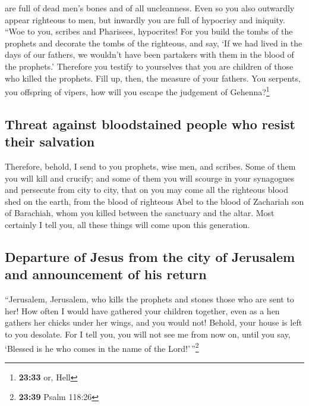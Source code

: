 are full of dead men's bones and of all uncleanness. 
Even so you also outwardly appear righteous to men, but inwardly you are
full of hypocrisy and iniquity.  ``Woe to you, scribes
and Pharisees, hypocrites! For you build the tombs of the prophets and
decorate the tombs of the righteous,  and say, `If we had
lived in the days of our fathers, we wouldn't have been partakers with
them in the blood of the prophets.'  Therefore you
testify to yourselves that you are children of those who killed the
prophets.  Fill up, then, the measure of your fathers.
 You serpents, you offspring of vipers, how will you
escape the judgement of Gehenna?\footnote{\textbf{23:33} or, Hell}

\hypertarget{threat-against-bloodstained-people-who-resist-their-salvation}{%
\subsection{Threat against bloodstained people who resist their
salvation}\label{threat-against-bloodstained-people-who-resist-their-salvation}}

 Therefore, behold, I send to you prophets, wise men, and
scribes. Some of them you will kill and crucify; and some of them you
will scourge in your synagogues and persecute from city to city,
 that on you may come all the righteous blood shed on the
earth, from the blood of righteous Abel to the blood of Zachariah son of
Barachiah, whom you killed between the sanctuary and the altar.
 Most certainly I tell you, all these things will come
upon this generation.

\hypertarget{departure-of-jesus-from-the-city-of-jerusalem-and-announcement-of-his-return}{%
\subsection{Departure of Jesus from the city of Jerusalem and
announcement of his
return}\label{departure-of-jesus-from-the-city-of-jerusalem-and-announcement-of-his-return}}

 ``Jerusalem, Jerusalem, who kills the prophets and
stones those who are sent to her! How often I would have gathered your
children together, even as a hen gathers her chicks under her wings, and
you would not!  Behold, your house is left to you
desolate.  For I tell you, you will not see me from now
on, until you say, `Blessed is he who comes in the name of the
Lord!'\,''\footnote{\textbf{23:39} Psalm 118:26}

